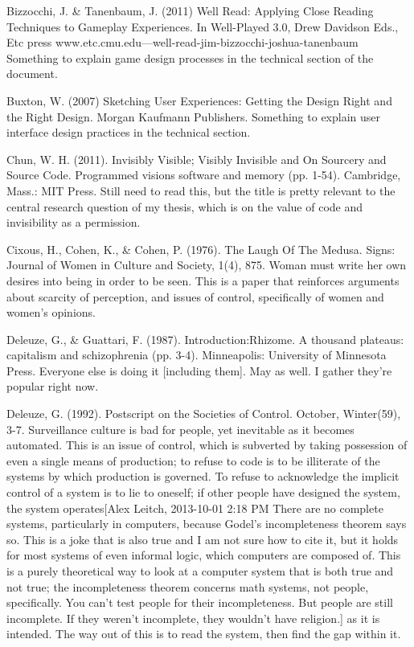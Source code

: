 Bizzocchi, J. & Tanenbaum, J. (2011) Well Read: Applying Close Reading Techniques to Gameplay 
	Experiences. In Well-Played 3.0, Drew Davidson Eds., Etc press
	www.etc.cmu.edu—well-read-jim-bizzocchi-joshua-tanenbaum
	Something to explain game design processes in the technical section of the document.

Buxton, W. (2007) Sketching User Experiences: Getting the Design Right and the Right Design. Morgan Kaufmann Publishers. 
	Something to explain user interface design practices in the technical section.

Chun, W. H. (2011). Invisibly Visible; Visibly Invisible and On Sourcery and Source Code. Programmed visions software and memory (pp. 1-54). Cambridge, Mass.: MIT Press.
	Still need to read this, but the title is pretty relevant to the central research question of my thesis, which is on the value of code and invisibility as a permission.

Cixous, H., Cohen, K., & Cohen, P. (1976). The Laugh Of The Medusa. Signs: Journal of Women in Culture and Society, 1(4), 875.
	Woman must write her own desires into being in order to be seen. This is a paper that reinforces arguments about scarcity of perception, and issues of control, specifically of women and women’s opinions.

Deleuze, G., & Guattari, F. (1987). Introduction:Rhizome. A thousand plateaus: capitalism and schizophrenia (pp. 3-4). Minneapolis: University of Minnesota Press.
	Everyone else is doing it [including them]. May as well. I gather they’re popular right now.


Deleuze, G. (1992). Postscript on the Societies of Control. October, Winter(59), 3-7.
	Surveillance culture is bad for people, yet inevitable as it becomes automated. This is an issue of control, which is subverted by taking possession of even a single means of production; to refuse to code is to be illiterate of the systems by which production is governed. To refuse to acknowledge the implicit control of a system is to lie to oneself; if other people have designed the system, the system operates[Alex Leitch, 2013-10-01 2:18 PM
There are no complete systems, particularly in computers, because Godel’s incompleteness theorem says so. This is a joke that is also true and I am not sure how to cite it, but it holds for most systems of even informal logic, which computers are composed of. This is a purely theoretical way to look at a computer system that is both true and not true; the incompleteness theorem concerns math systems, not people, specifically. You can’t test people for their incompleteness. But people are still incomplete. If they weren’t incomplete, they wouldn’t have religion.] as it is intended. The way out of this is to read the system, then find the gap within it. 

